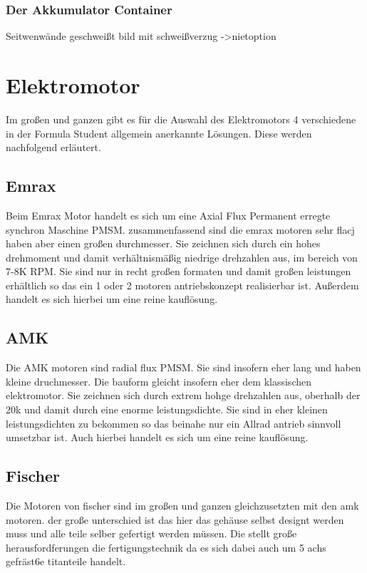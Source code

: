 \FloatBarrier
\subsubsection{Der Akkumulator Container}
Seitwenwände geschweißt bild mit schweißverzug
->nietoption

\section{Elektromotor}
Im großen und ganzen gibt es für die Auswahl des Elektromotors 4 verschiedene in der Formula Student allgemein anerkannte Lösungen. Diese werden nachfolgend erläutert.

\subsection{Emrax}
Beim Emrax Motor handelt es sich um eine Axial Flux Permanent erregte synchron Maschine PMSM. zusammenfassend sind die emrax motoren sehr flacj haben aber einen großen durchmesser. Sie zeichnen sich durch ein hohes drehmoment und damit verhältnismäßig niedrige drehzahlen aus, im bereich von 7-8K RPM. Sie sind nur in recht großen formaten und damit großen leistungen erhältlich so das ein 1 oder 2 motoren antriebskonzept realisierbar ist. Außerdem handelt es sich hierbei um eine reine kauflösung. 

\subsection{AMK}
Die AMK motoren sind radial flux PMSM. Sie sind insofern eher lang und haben kleine druchmesser. Die bauform gleicht insofern eher dem klassischen elektromotor. Sie zeichnen sich durch extrem hohge drehzahlen aus, oberhalb der 20k und damit durch eine enorme leistungsdichte. Sie sind in eher kleinen leistungsdichten zu bekommen so das beinahe nur ein Allrad antrieb sinnvoll umsetzbar ist. Auch hierbei handelt es sich um eine reine kauflösung. 

\subsection{Fischer}
Die Motoren von fischer sind im großen und ganzen gleichzusetzten mit den amk motoren. der große unterschied ist das hier das gehäuse selbst designt werden muss und alle teile selber gefertigt werden müssen. Die stellt große herausfordferungen die fertigungstechnik da es sich dabei auch um 5 achs gefräst6e titanteile handelt. 

